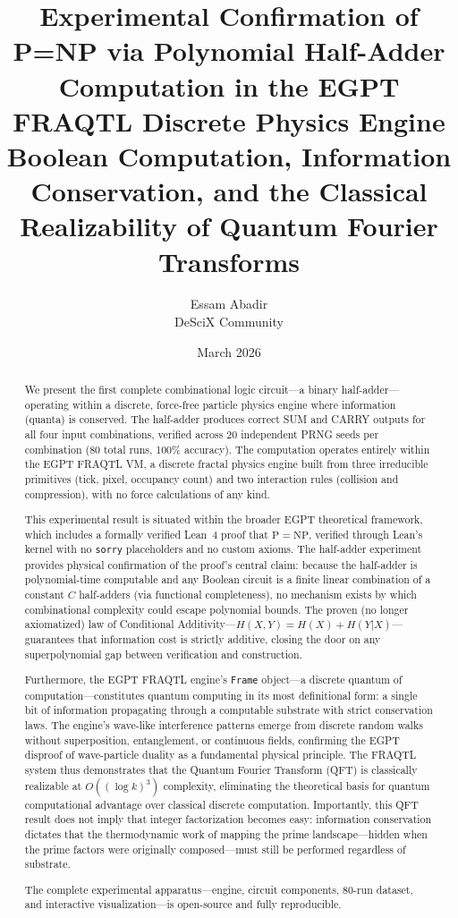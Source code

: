 \documentclass[11pt,a4paper]{article}
\title{%
    \textbf{Experimental Confirmation of P=NP via Polynomial Half-Adder Computation in the EGPT FRAQTL Discrete Physics Engine}\\[0.5em]
    \large Boolean Computation, Information Conservation, and the Classical Realizability of Quantum Fourier Transforms
}
\author{
    Essam Abadir\\[0.5em]
    \small DeSciX Community
}
\date{March 2026}
\begin{document}
\maketitle

\begin{abstract}
We present the first complete combinational logic circuit---a binary half-adder---operating within a discrete, force-free particle physics engine where information (quanta) is conserved. The half-adder produces correct SUM and CARRY outputs for all four input combinations, verified across 20 independent PRNG seeds per combination (80 total runs, 100\% accuracy). The computation operates entirely within the EGPT FRAQTL VM, a discrete fractal physics engine built from three irreducible primitives (tick, pixel, occupancy count) and two interaction rules (collision and compression), with no force calculations of any kind.

This experimental result is situated within the broader EGPT theoretical framework, which includes a formally verified Lean~4 proof that $\mathrm{P} = \mathrm{NP}$, verified through Lean's kernel with no \texttt{sorry} placeholders and no custom axioms. The half-adder experiment provides physical confirmation of the proof's central claim: because the half-adder is polynomial-time computable and any Boolean circuit is a finite linear combination of a constant $C$ half-adders (via functional completeness), no mechanism exists by which combinational complexity could escape polynomial bounds. The proven (no longer axiomatized) law of Conditional Additivity---$H(X,Y) = H(X) + H(Y|X)$---guarantees that information cost is strictly additive, closing the door on any superpolynomial gap between verification and construction.

Furthermore, the EGPT FRAQTL engine's \texttt{Frame} object---a discrete quantum of computation---constitutes quantum computing in its most definitional form: a single bit of information propagating through a computable substrate with strict conservation laws. The engine's wave-like interference patterns emerge from discrete random walks without superposition, entanglement, or continuous fields, confirming the EGPT disproof of wave-particle duality as a fundamental physical principle. The FRAQTL system thus demonstrates that the Quantum Fourier Transform (QFT) is classically realizable at $O((\log k)^3)$ complexity, eliminating the theoretical basis for quantum computational advantage over classical discrete computation. Importantly, this QFT result does not imply that integer factorization becomes easy: information conservation dictates that the thermodynamic work of mapping the prime landscape---hidden when the prime factors were originally composed---must still be performed regardless of substrate.

The complete experimental apparatus---engine, circuit components, 80-run dataset, and interactive visualization---is open-source and fully reproducible.
\end{abstract}
\end{document}

